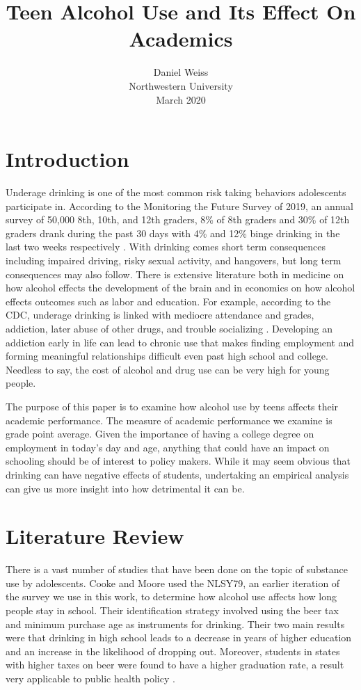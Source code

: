 \documentclass[11pt]{article}
\title{Teen Alcohol Use and Its Effect On Academics}
\author{
		Daniel Weiss\\	
		Northwestern University\\	
		March 2020
}
\date{}
\begin{document}
\maketitle
\thispagestyle{empty}

\clearpage \newpage
{}

\section*{Introduction}

Underage drinking is one of the most common risk taking behaviors adolescents participate in. According to the Monitoring the Future Survey of 2019, an annual survey of 50,000 8th, 10th, and 12th graders, 8\% of 8th graders and 30\% of 12th graders drank during the past 30 days with 4\% and 12\% binge drinking in the last two weeks respectively \cite{nida}. With drinking comes short term consequences including impaired driving, risky sexual activity, and hangovers, but long term consequences may also follow. There is extensive literature both in medicine on how alcohol effects the development of the brain and in economics on how alcohol effects outcomes such as labor and education. For example, according to the CDC, underage drinking is linked with mediocre attendance and grades, addiction, later abuse of other drugs, and trouble socializing \cite{cdc2}. Developing an addiction early in life can lead to chronic use that makes finding employment and forming meaningful relationships difficult even past high school and college. Needless to say, the cost of alcohol and drug use can be very high for young people.  

The purpose of this paper is to examine how alcohol use by teens affects their academic performance. The measure of academic performance we examine is grade point average. Given the importance of having a college degree on employment in today's day and age, anything that could have an impact on schooling should be of interest to policy makers. While it may seem obvious that drinking can have negative effects of students, undertaking an empirical analysis can give us more insight into how detrimental it can be. 

\section*{Literature Review}

There is a vast number of studies that have been done on the topic of substance use by adolescents. Cooke and Moore used the NLSY79, an earlier iteration of the survey we use in this work, to determine how alcohol use affects how long people stay in school. Their identification strategy involved using the beer tax and minimum purchase age as instruments for drinking. Their two main results were that drinking in high school leads to a decrease in years of higher education and an increase in the likelihood of dropping out. Moreover, students in states with higher taxes on beer were found to have a higher graduation rate, a result very applicable to public health policy \cite{COOK1993411}. 
\end{document}
